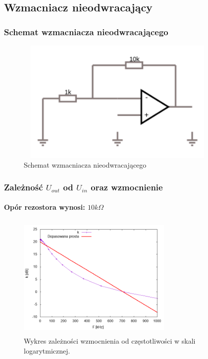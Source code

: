 \documentclass[a4paper,12pt]{article}
\begin{document}
\begin{justify}
\newpage

\subsection{Wzmacniacz nieodwracający}

\subsubsection{Schemat wzmacniacza nieodwracającego}

\begin{figure}[h]
\centering
\includegraphics[width=10cm, height=6cm]{wno}
\caption{Schemat wzmacniacza nieodwracającego}
\end{figure}

\subsubsection{Zależność $U_{out}$ od $U_{in}$ oraz wzmocnienie}

\paragraph{Opór rezostora wynosi: $10\si{k\Omega}$}

\begin{figure}[h]
\centering
\includegraphics[width=7.5cm, height=6cm]{plot_nieodwracajacy_10kohm}
\caption{Wykres zależności wzmocnienia od częstotliwości w skali logarytmicznej.}
\end{figure}


\end{justify}
\end{document}
